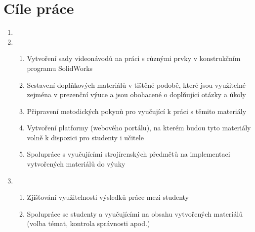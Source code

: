 \chapter{Cíle práce}

\begin{enumerate}[topsep=0pt]
    \setlength\itemsep{0em}
    \item {}
    
    \item {}
    \begin{enumerate}[topsep=0pt]
        \setlength\itemsep{0em}
        \item Vytvoření sady videonávodů na práci s různými prvky v konstrukčním programu SolidWorks
        \item Sestavení doplňkových materiálů v tištěné podobě, které jsou využitelné zejména v prezenční výuce a jsou obohacené o doplňující otázky a úkoly
        \item Připravení metodických pokynů pro vyučující k práci s těmito materiály
        \item Vytvoření platformy (webového portálu), na kterém budou tyto materiály volně k dispozici pro studenty i učitele
        \item Spolupráce s vyučujícími strojírenských předmětů na implementaci vytvořených materiálů do výuky
    \end{enumerate}

    \item {}
    \begin{enumerate}[topsep=0pt]
        \setlength\itemsep{0em}
        \item Zjišťování využitelnosti výsledků práce mezi studenty 
        \item Spolupráce se studenty a vyučujícími na obsahu vytvořených materiálů (volba témat, kontrola správnosti apod.) 
    \end{enumerate}
\end{enumerate}
